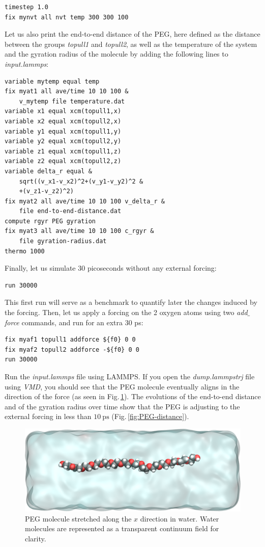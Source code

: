 \documentclass[9pt,tutorial]{livecoms}
\begin{document}
{\normalsize \begin{verbatim}
timestep 1.0
fix mynvt all nvt temp 300 300 100
\end{verbatim}}
Let us also print the end-to-end distance of the PEG,
here defined as the distance between the groups \textit{topull1}
and \textit{topull2}, as well as the temperature of the system and the gyration
radius of the molecule \cite{fixmanRadiusGyrationPolymer1962a}
by adding the following lines to \textit{input.lammps}:
{\normalsize \begin{verbatim}
variable mytemp equal temp
fix myat1 all ave/time 10 10 100 &
    v_mytemp file temperature.dat
variable x1 equal xcm(topull1,x)
variable x2 equal xcm(topull2,x)
variable y1 equal xcm(topull1,y)
variable y2 equal xcm(topull2,y)
variable z1 equal xcm(topull1,z)
variable z2 equal xcm(topull2,z)
variable delta_r equal &
    sqrt((v_x1-v_x2)^2+(v_y1-v_y2)^2 &
    +(v_z1-v_z2)^2)
fix myat2 all ave/time 10 10 100 v_delta_r &
    file end-to-end-distance.dat
compute rgyr PEG gyration
fix myat3 all ave/time 10 10 100 c_rgyr &
    file gyration-radius.dat
thermo 1000
\end{verbatim}}
Finally, let us simulate 30 picoseconds without any external forcing:
{\normalsize \begin{verbatim}
run 30000
\end{verbatim}}
This first run will serve as a benchmark to quantify later the changes induced by the forcing. Then, let us apply a forcing on the 2 oxygen atoms using two \textit{add$\_$force} commands, and run for an extra 30 ps:
{\normalsize \begin{verbatim}
fix myaf1 topull1 addforce ${f0} 0 0
fix myaf2 topull2 addforce -${f0} 0 0
run 30000
\end{verbatim}}
Run the \textit{input.lammps} file using LAMMPS. If you open the \textit{dump.lammpstrj} file using \textit{VMD}, you should see that the PEG molecule eventually aligns in the direction of the force (as seen in Fig.\,\ref{fig:PEG-in-water}). The evolutions of the end-to-end distance and of the gyration radius over time show that the PEG is adjusting to the external forcing in less than $10~\text{ps}$ (Fig.\,\ref{fig:PEG-distance}).

\begin{figure}
\centering
\includegraphics[width=\linewidth]{PEG-in-water}
\caption{PEG molecule stretched along the $x$ direction in water. Water molecules are represented as a transparent continuum field for clarity.}
\label{fig:PEG-in-water}
\end{figure}
\end{document}
